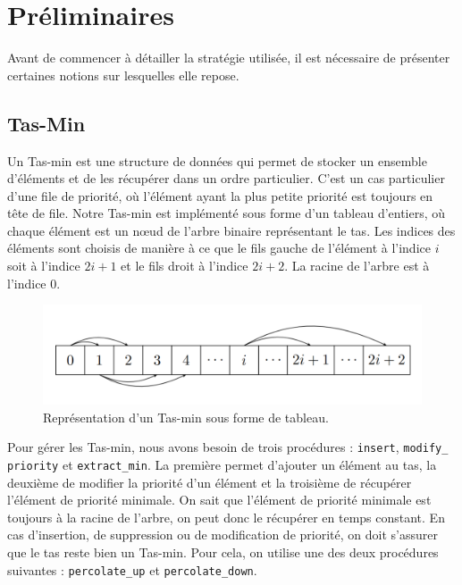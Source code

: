 \chapter{Préliminaires}
\label{cp:preliminaires}

Avant de commencer à détailler la stratégie utilisée, il est nécessaire de présenter certaines notions sur lesquelles elle repose.

\section{Tas-Min}
\label{sec:tas-min}

Un Tas-min est une structure de données qui permet de stocker un ensemble d'éléments et de les récupérer dans un ordre particulier. 
C'est un cas particulier d'une file de priorité, où l'élément ayant la plus petite priorité est toujours en tête de file.
\newline\newline
Notre Tas-min est implémenté sous forme d'un tableau d'entiers, où chaque élément est un nœud de l'arbre binaire représentant le tas.
Les indices des éléments sont choisis de manière à ce que le fils gauche de l'élément à l'indice $i$ soit à l'indice $2i + 1$ et le fils droit à l'indice $2i + 2$.
La racine de l'arbre est à l'indice 0.

\begin{figure}[!htpb]
    \centering
    \includegraphics[width=0.9\linewidth]{Figures/array.png}
    \caption[Représentation d'un Tas-min sous forme de tableau.]{Représentation d'un Tas-min sous forme de tableau.}
    \label{fig:array}
\end{figure}

Pour gérer les Tas-min, nous avons besoin de trois procédures : \texttt{insert}, \texttt{modify\_}
\newline
\texttt{priority} et \texttt{extract\_min}.
La première permet d'ajouter un élément au tas, la deuxième de modifier la priorité d'un élément et la troisième de récupérer l'élément de priorité minimale.
\newline
On sait que l'élément de priorité minimale est toujours à la racine de l'arbre, on peut donc le récupérer en temps constant.
En cas d'insertion, de suppression ou de modification de priorité, on doit s'assurer que le tas reste bien un Tas-min.
Pour cela, on utilise une des deux procédures suivantes : \texttt{percolate\_up} et \texttt{percolate\_down}.

